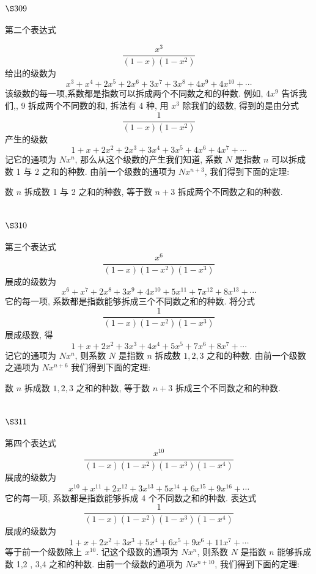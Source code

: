 \section{$\S 309$}

第二个表达式

\[
\frac{x^3}{(1-x)\left(1-x^{2}\right)}
\]
给出的级数为
\[
x^{3}+x^{4}+2 x^{5}+2 x^{6}+3 x^{7}+3 x^{8}+4 x^{9}+4 x^{10}+\cdots
\]
该级数的每一项,系数都是指数可以拆成两个不同数之和的种数. 例如, $4 x^{9}$ 告诉我们,, 9 拆成两个不同数的和, 拆法有 4 种, 用 $x^{3}$ 除我们的级数, 得到的是由分式
\[
\frac{1}{(1-x)\left(1-x^{2}\right)}
\]
产生的级数
\[
1+x+2 x^{2}+2 x^{3}+3 x^{4}+3 x^{5}+4 x^{6}+4 x^{7}+\cdots
\]
记它的通项为 $N x^{n}$, 那么从这个级数的产生我们知道, 系数 $N$ 是指数 $n$ 可以拆成数 1 与 2 之和的种数. 由前一个级数的通项为 $N x^{n+3}$, 我们得到下面的定理:

数 $n$ 拆成数 1 与 2 之和的种数, 等于数 $n+3$ 拆成两个不同数之和的种数.

\section{$\S 310$}

第三个表达式
\[
\frac{x^{6}}{(1-x)\left(1-x^{2}\right)\left(1-x^{3}\right)}
\]
展成的级数为
\[
x^{6}+x^{7}+2 x^{8}+3 x^{9}+4 x^{10}+5 x^{11}+7 x^{12}+8 x^{13}+\cdots
\]
它的每一项, 系数都是指数能够拆成三个不同数之和的种数. 将分式
\[
\frac{1}{(1-x)\left(1-x^{2}\right)\left(1-x^{3}\right)}
\]
展成级数, 得
\[
1+x+2 x^{2}+3 x^{3}+4 x^{4}+5 x^{5}+7 x^{6}+8 x^{7}+\cdots
\]
记它的通项为 $N x^{n}$, 则系数 $N$ 是指数 $n$ 拆成数 $1,2,3$ 之和的种数. 由前一个级数之通项为 $N x^{n+6}$ 我们得到下面的定理:

数 $n$ 拆成数 $1,2,3$ 之和的种数, 等于数 $n+3$ 拆成三个不同数之和的种数.

\section{$\S 311$}

第四个表达式
\[
\frac{x^{10}}{(1-x)\left(1-x^{2}\right)\left(1-x^{3}\right)\left(1-x^{4}\right)}
\]
展成的级数为
\[
x^{10}+x^{11}+2 x^{12}+3 x^{13}+5 x^{14}+6 x^{15}+9 x^{16}+\cdots
\]
它的每一项, 系数都是指数能够拆成 4 个不同数之和的种数. 表达式 
\[
\frac{1}{(1-x)\left(1-x^{2}\right)\left(1-x^{3}\right)\left(1-x^{4}\right)}
\]
展成的级数为
\[
1+x+2 x^{2}+3 x^{3}+5 x^{4}+6 x^{5}+9 x^{6}+11 x^{7}+\cdots
\]
等于前一个级数除上 $x^{10}$. 记这个级数的通项为 $N x^{n}$, 则系数 $N$ 是指数 $n$ 能够拆成数 1,2 , 3,4 之和的种数. 由前一个级数的通项为 $N x^{n+10}$, 我们得到下面的定理:

